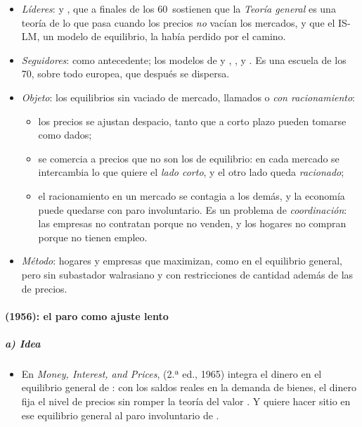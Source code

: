 \documentclass[11pt]{article}
\begin{document}
\begin{itemize}
\item \emph{Líderes}:  y , que a finales de los 60~sostienen que la \emph{Teoría general} es una teoría de lo que pasa cuando los precios \emph{no} vacían los mercados, y que el IS-LM, un modelo de equilibrio, la había perdido por el camino.
\item \emph{Seguidores}:  como antecedente; los modelos de  y , ,  y . Es una escuela de los 70, sobre todo europea, que después se dispersa\nocite{DeVroey2016History}.
\item \emph{Objeto}: los equilibrios sin vaciado de mercado, llamados  o \emph{con racionamiento}:
  \begin{itemize}
  \item los precios se ajustan despacio, tanto que a corto plazo pueden tomarse como dados;
  \item se comercia a precios que no son los de equilibrio: en cada mercado se intercambia lo que quiere el \emph{lado corto}, y el otro lado queda \emph{racionado};
  \item el racionamiento en un mercado se contagia a los demás, y la economía puede quedarse con paro involuntario. Es un problema de \emph{coordinación}: las empresas no contratan porque no venden, y los hogares no compran porque no tienen empleo.
  \end{itemize}
\item \emph{Método}: hogares y empresas que maximizan, como en el equilibrio general, pero sin subastador walrasiano y con restricciones de cantidad además de las de precios.
\end{itemize}

\paragraph{ (1956): el paro como ajuste lento}

\subparagraph{a) Idea}

\begin{itemize}
\item En \emph{Money, Interest, and Prices}, \textcite{Patinkin1956Money} (2.ª ed., 1965) integra el dinero en el equilibrio general de : con los saldos reales en la demanda de bienes, el dinero fija el nivel de precios sin romper la teoría del valor . Y quiere hacer sitio en ese equilibrio general al paro involuntario de .
\end{itemize}
\end{document}
